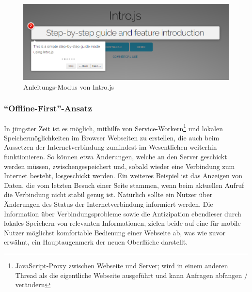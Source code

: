  \begin{figure}
    \centering
    \captionsetup{justification=centering}
    \includegraphics[width=\textwidth]{figures/intro_js_example.png}
        \caption{Anleitungs-Modus von Intro.js \parencite{mehrabani}}\label{fig:intro_js_example}
\end{figure}

\subsubsection{``Offline-First''-Ansatz}
In jüngster Zeit ist es möglich, mithilfe von Service-Workern\footnote{JavaScript-Proxy zwischen Webseite und Server; wird in einem anderen Thread als die eigentliche Webseite ausgeführt und kann Anfragen abfangen / verändern} und lokalen Speichermöglichkeiten im Browser Webseiten zu erstellen, die auch beim Aussetzen der Internetverbindung zumindest im Wesentlichen weiterhin funktionieren. So können etwa Änderungen, welche an den Server geschickt werden müssen, zwischengespeichert und, sobald wieder eine Verbindung zum Internet besteht, losgeschickt werden. Ein weiteres Beispiel ist das Anzeigen von Daten, die vom letzten Besuch einer Seite stammen, wenn beim aktuellen Aufruf die Verbindung nicht stabil genug ist. Natürlich sollte ein Nutzer über Änderungen des Status der Internetverbindung informiert werden.
Die Information über Verbindungsprobleme sowie die Antizipation ebendieser durch lokales Speichern von relevanten Informationen, zielen beide auf eine für mobile Nutzer möglichst komfortable Bedienung einer Webseite ab, was wie zuvor erwähnt, ein Hauptaugenmerk der neuen Oberfläche darstellt.

